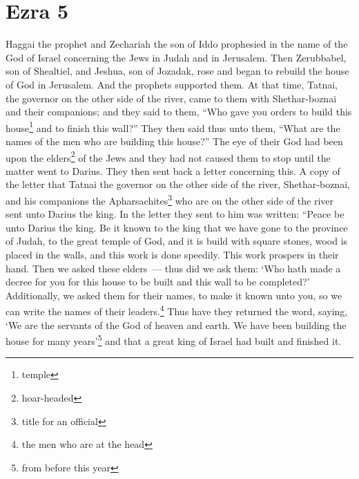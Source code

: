 \section{Ezra 5}\label{Ezra 5}
\begin{enumerate}[align=center]
     Haggai the prophet and Zechariah the son of Iddo prophesied in the name of the God of Israel concerning the Jews in Judah and in Jerusalem.%
     Then Zerubbabel, son of Shealtiel, and Jeshua, son of Jozadak, rose and began to rebuild the house of God in Jerusalem. And the prophets supported them.%
     At that time, Tatnai, the governor on the other side of the river, came to them with Shethar-boznai and their companions; and they said to them, ``Who gave you orders to build this house\footnote{temple} and to finish this wall?''%
     They then said thus unto them, ``What are the names of the men who are building this house?''%
     The eye of their God had been upon the elders\footnote{hoar-headed} of the Jews and they had not caused them to stop until the matter went to Darius. They then sent back a letter concerning this.%
     A copy of the letter that Tatnai the governor on the other side of the river, Shethar-boznai, and his companions the Apharsachites\footnote{title for an official} who are on the other side of the river sent unto Darius the king.%
     In the letter they sent to him was written: ``Peace be unto Darius the king.%
     Be it known to the king that we have gone to the province of Judah, to the great temple of God, and it is build with square stones, wood is placed in the walls, and this work is done speedily. This work prospers in their hand.%
     Then we asked these elders~--- thus did we ask them: `Who hath made a decree for you for this house to be built and this wall to be completed?'%
     Additionally, we asked them for their names, to make it known unto you, so we can write the names of their leaders.\footnote{the men who are at the head}%
     Thus have they returned the word, saying, `We are the servants of the God of heaven and earth. We have been building the house for many years'\footnote{from before this year} and that a great king of Israel had built and finished it.%

\end{enumerate}
